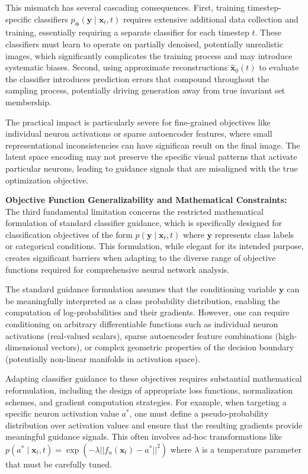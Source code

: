 This mismatch has several cascading consequences. First, training timestep-specific classifiers $p_{\boldsymbol{\phi}}(\mathbf{y} \mid \mathbf{x}_t, t)$ requires extensive additional data collection and training, essentially requiring a separate classifier for each timestep $t$. These classifiers must learn to operate on partially denoised, potentially unrealistic images, which significantly complicates the training process and may introduce systematic biases. Second, using approximate reconstructions $\hat{\mathbf{x}}_0(t)$ to evaluate the classifier introduces prediction errors that compound throughout the sampling process, potentially driving generation away from true invariant set membership.

The practical impact is particularly severe for fine-grained objectives like individual neuron activations or sparse autoencoder features, where small representational inconsistencies can have significan result on the final image. The latent space encoding may not preserve the specific visual patterns that activate particular neurons, leading to guidance signals that are misaligned with the true optimization objective.

\textbf{Objective Function Generalizability and Mathematical Constraints:} The third fundamental limitation concerns the restricted mathematical formulation of standard classifier guidance, which is specifically designed for classification objectives of the form $p(\mathbf{y} \mid \mathbf{x}_t, t)$ where $\mathbf{y}$ represents class labels or categorical conditions. This formulation, while elegant for its intended purpose, creates significant barriers when adapting to the diverse range of objective functions required for comprehensive neural network analysis.

The standard guidance formulation assumes that the conditioning variable $\mathbf{y}$ can be meaningfully interpreted as a class probability distribution, enabling the computation of log-probabilities and their gradients. However, one can require conditioning on arbitrary differentiable functions such as individual neuron activations (real-valued scalars), sparse autoencoder feature combinations (high-dimensional vectors), or complex geometric properties of the decision boundary (potentially non-linear manifolds in activation space).

Adapting classifier guidance to these objectives requires substantial mathematical reformulation, including the design of appropriate loss functions, normalization schemes, and gradient computation strategies. For example, when targeting a specific neuron activation value $a^*$, one must define a pseudo-probability distribution over activation values and ensure that the resulting gradients provide meaningful guidance signals. This often involves ad-hoc transformations like $p(a^* \mid \mathbf{x}_t, t) = \exp(-\lambda ||f_n(\mathbf{x}_t) - a^*||^2)$ where $\lambda$ is a temperature parameter that must be carefully tuned.


